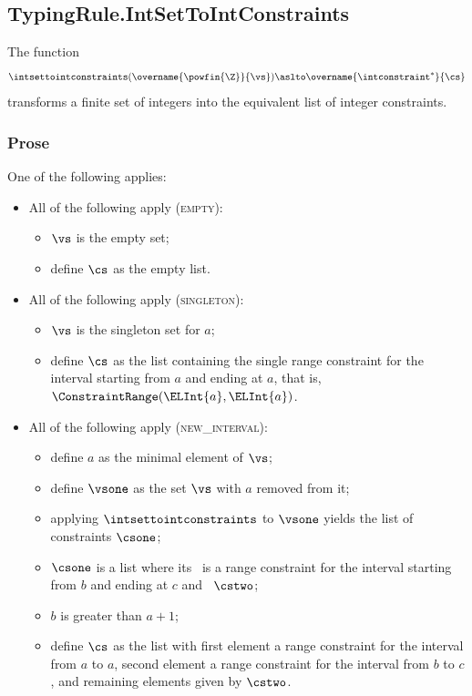 \subsection{TypingRule.IntSetToIntConstraints \label{sec:TypingRule.IntSetToIntConstraints}}
\hypertarget{def-intsettointconstraints}{}
The function
\[
\intsettointconstraints(\overname{\powfin{\Z}}{\vs})
\aslto \overname{\intconstraint^*}{\cs}
\]
transforms a finite set of integers into the equivalent list of integer constraints.

\subsubsection{Prose}
One of the following applies:
\begin{itemize}
  \item All of the following apply (\textsc{empty}):
  \begin{itemize}
    \item $\vs$ is the empty set;
    \item define $\cs$ as the empty list.
  \end{itemize}

  \item All of the following apply (\textsc{singleton}):
  \begin{itemize}
    \item $\vs$ is the singleton set for $a$;
    \item define $\cs$ as the list containing the single range constraint for the interval starting from $a$
          and ending at $a$, that is, $\ConstraintRange(\ELInt{a}, \ELInt{a})$.
  \end{itemize}

  \item All of the following apply (\textsc{new\_interval}):
  \begin{itemize}
    \item define $a$ as the minimal element of $\vs$;
    \item define $\vsone$ as the set $\vs$ with $a$ removed from it;
    \item applying $\intsettointconstraints$ to $\vsone$ yields the list of constraints $\csone$;
    \item $\csone$ is a list where its \head\ is a range constraint for the interval starting from $b$ and ending at $c$
          and \tail\ $\cstwo$;
    \item $b$ is greater than $a+1$;
    \item define $\cs$ as the list with first element a range constraint for the interval from $a$ to $a$,
          second element a range constraint for the interval from $b$ to $c$, and remaining elements given by $\cstwo$.
  \end{itemize}


\end{itemize}
